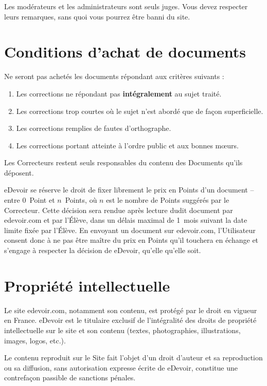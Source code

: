 Les modérateurs et les administrateurs sont seuls juges. Vous devez respecter leurs remarques, sans quoi vous pourrez être banni du site.


\section{Conditions d'achat de documents}

Ne seront pas achetés les documents répondant aux critères suivants :
\begin{enumerate}
   \item Les corrections ne répondant pas \textbf{intégralement} au sujet traité.
   \item Les corrections trop courtes où le sujet n'est abordé que de façon superficielle.
   \item Les corrections remplies de fautes d'orthographe.
   \item Les corrections portant atteinte à l'ordre public et aux bonnes m\oe{}urs.
\end{enumerate}

Les Correcteurs restent seuls responsables du contenu des Documents qu'ils déposent.

eDevoir se réserve le droit de fixer librement le prix en Points d'un document -- entre 0~Point et $n$~Points, où $n$ est le nombre de Points suggérés par le Correcteur. Cette décision sera rendue après lecture dudit document par edevoir.com et par l'\'Elève, dans un délais maximal de 1~mois suivant la date limite fixée par l'\'Elève. En envoyant un document sur edevoir.com, l'Utilisateur consent donc à ne pas être maître du prix en Points qu'il touchera en échange et s'engage à respecter la décision de eDevoir, qu'elle qu'elle soit.


\section{Propriété intellectuelle}

Le site edevoir.com, notamment son contenu, est protégé par le droit en vigueur en France. eDevoir est le titulaire exclusif de l'intégralité des droits de propriété intellectuelle sur le site et son contenu (textes, photographies, illustrations, images, logos, etc.).

Le contenu reproduit sur le Site fait l’objet d’un droit d'auteur et sa reproduction ou sa diffusion, sans autorisation expresse écrite de eDevoir, constitue une contrefaçon passible de sanctions pénales.

